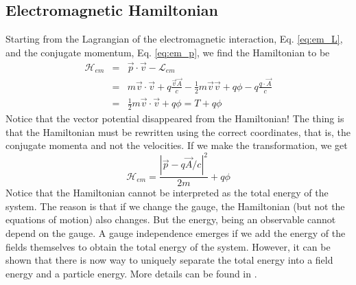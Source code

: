 \documentclass[11pt,fleqn]{book} %
\begin{document}
\subsection*{Electromagnetic Hamiltonian}
Starting from the Lagrangian of the electromagnetic interaction, Eq. \ref{eq:em_L}, and the conjugate momentum, Eq. \ref{eq:em_p}, we find
the Hamiltonian to be
\begin{eqnarray*}
    \mathcal{H}_{em} &=& \vec{p}\cdot\vec{v}-\mathcal{L}_{em} \\
    &=& m\vec{v}\cdot\vec{v}+q\frac{\vec{v}\vec{A}}{c}-\frac{1}{2}m\vec{v}\vec{v}+q\phi-q\frac{q\cdot\vec A}{c} \\
    &=& \frac{1}{2}m\vec{v}\cdot\vec{v}+q\phi = T+q\phi
\end{eqnarray*}
Notice that the vector potential disappeared from the Hamiltonian! The thing is that the Hamiltonian must be rewritten using the correct coordinates, that is,
the conjugate momenta and not the velocities. If we make the transformation, we get
\begin{equation*}
    \mathcal{H}_{em} = \frac{|\vec{p}-q\vec{A}/c|^2}{2m} + q\phi
\end{equation*}
Notice that the Hamiltonian cannot be interpreted as the total energy of the system. The reason is that if we change the gauge, the Hamiltonian (but not the equations of motion)
also changes. But the energy, being an observable cannot depend on the gauge. A gauge independence emerges if we add the energy of the fields themselves to obtain the total
energy of the system. However, it can be shown that there is now way to uniquely separate the total energy into a field energy and a particle energy. 
More details can be found in \cite{kobe}.
\end{document}
